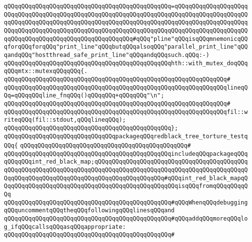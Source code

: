 \verb|qQQqqQQqqQQqqQQqqQQqqQQqqQQqqQQqqQQqqQQqqQQqqQQq=qQQqqQQqqQQqqQQqqQQqqQQqqQQqqQQqqQQqqQQqqQQqqQQqqQQqqQQqqQQqqQQqqQQqqQQqqQQqqQQqqQQqqQQqqQQqqQQqqQQqqQQqqQQqqQQqqQQqqQQqqQQqqQQqqQQqqQQqqQQqqQQqqQQqqQQqqQQqqQQqqQQqqQQqqQQqqQQqqQQqqQQqqQQqqQQqqQQqqQQqqQQqqQQqqQQqqQQqqQQqqQQqqQQqqQQqqQQqqQQqqQQqqQQqqQQqqQQqqQQqqQQqqQQq#qQQq"pline"qQQqisqQQqmnemonicqQQqforqQQqforqQQq"print_line"qQQqbutqQQqalsoqQQq"parallel_print_line"qQQqandqQQq"hostthread_safe_print_line"qQQqandqQQqsuch.qQQq:-)|\newline
\verb|qQQqqQQqqQQqqQQqqQQqqQQqqQQqqQQqqQQqqQQqqQQqqQQqhth::with_mutex_doqQQqqQQqmtx::mutexqQQqqQQq{.|\newline
\verb|qQQqqQQqqQQqqQQqqQQqqQQqqQQqqQQqqQQqqQQqqQQqqQQqqQQqqQQqqQQqqQQq#|\newline
\verb|qQQqqQQqqQQqqQQqqQQqqQQqqQQqqQQqqQQqqQQqqQQqqQQqqQQqqQQqqQQqqQQqlineqQQq=qQQqqQQqline_fnqQQq()qQQqqQQq+qQQqqQQq"\n";|\newline
\verb|qQQqqQQqqQQqqQQqqQQqqQQqqQQqqQQqqQQqqQQqqQQqqQQqqQQqqQQqqQQqqQQq#|\newline
\verb|qQQqqQQqqQQqqQQqqQQqqQQqqQQqqQQqqQQqqQQqqQQqqQQqqQQqqQQqqQQqqQQqfil::writeqQQq(fil::stdout,qQQqlineqQQq);|\newline
\verb|qQQqqQQqqQQqqQQqqQQqqQQqqQQqqQQqqQQqqQQqqQQqqQQq};|\newline
\newline
\verb|qQQqqQQqqQQqqQQqqQQqqQQqqQQqqQQqpackageqQQqredblack_tree_torture_testqQQq{|\newline
\verb|qQQqqQQqqQQqqQQqqQQqqQQqqQQqqQQqqQQqqQQqqQQqqQQq#|\newline
\verb|qQQqqQQqqQQqqQQqqQQqqQQqqQQqqQQqqQQqqQQqqQQqqQQqincludeqQQqpackageqQQqqQQqqQQqint_red_black_map;qQQqqQQqqQQqqQQqqQQqqQQqqQQqqQQqqQQqqQQqqQQqqQQqqQQqqQQqqQQqqQQqqQQqqQQqqQQqqQQqqQQqqQQqqQQqqQQqqQQqqQQqqQQqqQQqqQQqqQQqqQQqqQQqqQQqqQQqqQQqqQQqqQQqqQQqqQQqqQQq#qQQqint_red_black_mapqQQqqQQqqQQqqQQqqQQqqQQqqQQqqQQqqQQqqQQqqQQqqQQqqQQqisqQQqfromqQQqqQQqqQQq|\newline
\newline
\verb|qQQqqQQqqQQqqQQqqQQqqQQqqQQqqQQqqQQqqQQqqQQqqQQq#qQQqWhenqQQqdebuggingqQQquncommentqQQqtheqQQqfollowingqQQqlinesqQQqand|\newline
\verb|qQQqqQQqqQQqqQQqqQQqqQQqqQQqqQQqqQQqqQQqqQQqqQQq#qQQqaddqQQqmoreqQQqlog_ifqQQqcallsqQQqasqQQqappropriate:|\newline
\verb|qQQqqQQqqQQqqQQqqQQqqQQqqQQqqQQqqQQqqQQqqQQqqQQq#|\newline
